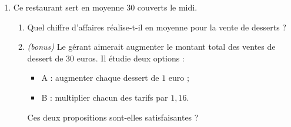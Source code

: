 \documentclass[11pt]{article}
\begin{document}
\begin{exo}[$4$ points]
\begin{enumerate}
  \item Ce restaurant sert en moyenne $30$ couverts le midi.
    \begin{enumerate}
      \item Quel chiffre d'affaires réalise-t-il en moyenne pour la vente de
        desserts ?
      \item \emph{(bonus)} Le gérant aimerait augmenter le montant total des
        ventes de dessert de $30$ euros. Il étudie deux options :
        \begin{itemize}
          \item A : augmenter chaque dessert de $1$ euro ;
          \item B : multiplier chacun des tarifs par $1,16$.
        \end{itemize}
        Ces deux propositions sont-elles satisfaisantes ?
    \end{enumerate}
\end{enumerate}
\end{exo}
\end{document}
